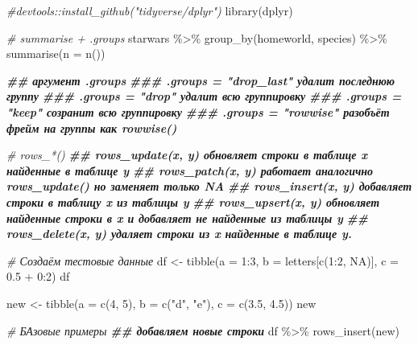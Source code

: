 \documentclass[
]{book}
\newenvironment{Shaded}{\begin{snugshade}}{\end{snugshade}}
\newcommand{\AttributeTok}[1]{\textcolor[rgb]{0.77,0.63,0.00}{#1}}
\newcommand{\CommentTok}[1]{\textcolor[rgb]{0.56,0.35,0.01}{\textit{#1}}}
\newcommand{\ConstantTok}[1]{\textcolor[rgb]{0.00,0.00,0.00}{#1}}
\newcommand{\DecValTok}[1]{\textcolor[rgb]{0.00,0.00,0.81}{#1}}
\newcommand{\DocumentationTok}[1]{\textcolor[rgb]{0.56,0.35,0.01}{\textbf{\textit{#1}}}}
\newcommand{\FloatTok}[1]{\textcolor[rgb]{0.00,0.00,0.81}{#1}}
\newcommand{\FunctionTok}[1]{\textcolor[rgb]{0.00,0.00,0.00}{#1}}
\newcommand{\NormalTok}[1]{#1}
\newcommand{\OtherTok}[1]{\textcolor[rgb]{0.56,0.35,0.01}{#1}}
\newcommand{\SpecialCharTok}[1]{\textcolor[rgb]{0.00,0.00,0.00}{#1}}
\newcommand{\StringTok}[1]{\textcolor[rgb]{0.31,0.60,0.02}{#1}}
\begin{document}
\begin{Shaded}
\begin{Highlighting}[]
\CommentTok{\#devtools::install\_github("tidyverse/dplyr")}
\FunctionTok{library}\NormalTok{(dplyr)}

\CommentTok{\# summarise + .groups}
\NormalTok{starwars }\SpecialCharTok{\%\textgreater{}\%} 
  \FunctionTok{group\_by}\NormalTok{(homeworld, species) }\SpecialCharTok{\%\textgreater{}\%} 
  \FunctionTok{summarise}\NormalTok{(}\AttributeTok{n =} \FunctionTok{n}\NormalTok{())}

\DocumentationTok{\#\# аргумент .groups}
\DocumentationTok{\#\#\# .groups = "drop\_last" удалит последнюю группу}
\DocumentationTok{\#\#\# .groups = "drop" удалит всю группировку}
\DocumentationTok{\#\#\# .groups = "keep" созранит всю группировку}
\DocumentationTok{\#\#\# .groups = "rowwise" разобъёт фрейм на группы как rowwise()}

\CommentTok{\# rows\_*()}
\DocumentationTok{\#\# rows\_update(x, y) обновляет строки в таблице x найденные в таблице y}
\DocumentationTok{\#\# rows\_patch(x, y) работает аналогично rows\_update() но заменяет только NA}
\DocumentationTok{\#\# rows\_insert(x, y) добавляет строки в таблицу x из таблицы y}
\DocumentationTok{\#\# rows\_upsert(x, y) обновляет найденные строки в x и добавляет не найденные из таблицы y}
\DocumentationTok{\#\# rows\_delete(x, y) удаляет строки из x найденные в таблице y.}

\CommentTok{\# Создаём тестовые данные}
\NormalTok{df }\OtherTok{\textless{}{-}} \FunctionTok{tibble}\NormalTok{(}\AttributeTok{a =} \DecValTok{1}\SpecialCharTok{:}\DecValTok{3}\NormalTok{, }\AttributeTok{b =}\NormalTok{ letters[}\FunctionTok{c}\NormalTok{(}\DecValTok{1}\SpecialCharTok{:}\DecValTok{2}\NormalTok{, }\ConstantTok{NA}\NormalTok{)], }\AttributeTok{c =} \FloatTok{0.5} \SpecialCharTok{+} \DecValTok{0}\SpecialCharTok{:}\DecValTok{2}\NormalTok{)}
\NormalTok{df}

\NormalTok{new }\OtherTok{\textless{}{-}} \FunctionTok{tibble}\NormalTok{(}\AttributeTok{a =} \FunctionTok{c}\NormalTok{(}\DecValTok{4}\NormalTok{, }\DecValTok{5}\NormalTok{), }\AttributeTok{b =} \FunctionTok{c}\NormalTok{(}\StringTok{"d"}\NormalTok{, }\StringTok{"e"}\NormalTok{), }\AttributeTok{c =} \FunctionTok{c}\NormalTok{(}\FloatTok{3.5}\NormalTok{, }\FloatTok{4.5}\NormalTok{))}
\NormalTok{new}

\CommentTok{\# БАзовые примеры}
\DocumentationTok{\#\# добавляем новые строки}
\NormalTok{df }\SpecialCharTok{\%\textgreater{}\%} \FunctionTok{rows\_insert}\NormalTok{(new)}


\end{Highlighting}
\end{Shaded}
\end{document}
